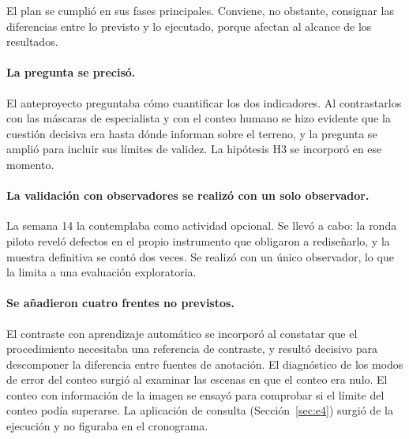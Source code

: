 El plan se cumplió en sus fases principales. Conviene, no obstante, consignar las diferencias
entre lo previsto y lo ejecutado, porque afectan al alcance de los resultados.

\paragraph{La pregunta se precisó.} El anteproyecto preguntaba cómo cuantificar los dos
indicadores. Al contrastarlos con las máscaras de especialista y con el conteo humano se hizo
evidente que la cuestión decisiva era hasta dónde informan sobre el terreno, y la pregunta se
amplió para incluir sus límites de validez. La hipótesis H3 se incorporó en ese momento.

\paragraph{La validación con observadores se realizó con un solo observador.} La semana 14 la
contemplaba como actividad opcional. Se llevó a cabo: la ronda piloto reveló defectos en el
propio instrumento que obligaron a rediseñarlo, y la muestra definitiva se contó dos veces. Se realizó con un único observador,
lo que la limita a una evaluación exploratoria.

\paragraph{Se añadieron cuatro frentes no previstos.} El contraste con aprendizaje automático se
incorporó al constatar que el procedimiento necesitaba una referencia de contraste, y resultó
decisivo para descomponer la diferencia entre fuentes de anotación. El diagnóstico de los
modos de error del conteo surgió al examinar las escenas en que el conteo era nulo. El conteo con
información de la imagen se ensayó para comprobar si el límite del conteo podía superarse. La aplicación de consulta
(Sección~\ref{sec:e4}) surgió de la ejecución y no figuraba en el cronograma.
